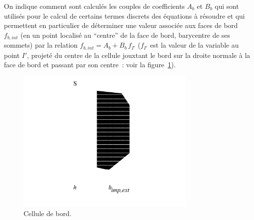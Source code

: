 On indique comment sont calcul\'es les couples de coefficients
$A_b$ et $B_b$ qui sont utilis\'es pour le calcul de certains
termes discrets des \'equations \`a r\'esoudre et qui
permettent  en particulier de d\'eterminer une valeur associ\'ee aux faces
de bord $f_{b,int}$ (en un point localis\'e au ``centre'' de la face de bord,
barycentre de ses sommets) par la
relation $f_{b,int} = A_b+B_b\,f_{I'}$ ($f_{I'}$ est la valeur de
la variable au point
$I'$, projet\'e du centre de la cellule jouxtant le bord sur la droite
normale \`a
la face de bord et passant par son centre~: voir la figure~\ref{Base_Clptur_fig_flux_clptur}).

\begin{figure}[h]
\centerline{\includegraphics[height=7cm]{../Base/Clptur/Images/fluxbord.pdf}}
\caption{\label{Base_Clptur_fig_flux_clptur}Cellule de bord.}
\end{figure}
